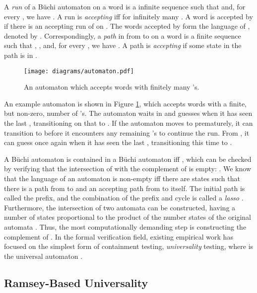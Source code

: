 \documentclass{LMCS}
\newcommand\buchi{B\"uchi }
\begin{document}
A {\em run} of a \buchi automaton  on a word  is a
infinite sequence  such that  and, for every , we have .  A run
is \emph{accepting} iff  for infinitely many .  A word
 is accepted by  if there is an accepting run of 
on .  The words accepted by  form the language of , denoted by
.  Correspondingly, a {\em path} in  from  to  on a word  is a finite sequence  such that
, , and, for every , we have .  A path is {\em accepting} if some state in the path is in . 

\begin{figure}
\begin{center}
{\texttt{[image: diagrams/automaton.pdf]}}
\end{center}
\caption{An automaton which accepts words with finitely many 's.}\label{fig:automaton}
\end{figure}

\begin{exa}
An example automaton is shown in Figure \ref{fig:automaton}, which accepts words with a finite, but
non-zero, number of
's. The automaton waits in  and guesses when it has seen the last , transitioning on that
 to . If the automaton moves to  prematurely, it can transition to  before it encounters
any remaining 's to continue the run. From , it can guess once again when it has seen the last
, transitioning this time to .
\end{exa}

A \buchi automaton  is contained in a \buchi automaton  iff , which can be checked by verifying that the intersection of
 with the complement  of  is empty: .  We know that the language of an automaton is
non-empty iff there are states  such that there is a
path from  to  and an accepting path from  to itself.  The initial path
is called the prefix, and the combination of the prefix and cycle is called a
\emph{lasso} \cite{Var07a}.  Furthermore, the intersection of two automata can be
constructed, having a number of states proportional to the product of the number
states of the original automata \cite{Cho74}.
Thus, the most computationally demanding step is constructing the complement of
.  In the formal verification field, existing empirical work has focused on
the simplest form of containment testing, \emph{universality} testing, where
 is the universal automaton \cite{DR07,TV05}.

\subsection{Ramsey-Based Universality}\label{Sect:Ramsey-Based_Universality}
\end{document}

